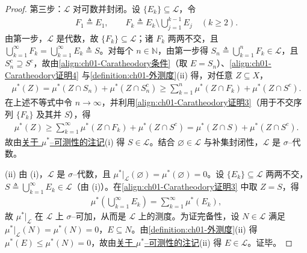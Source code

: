 \documentclass[../../main.tex]{subfiles}%
\begin{document}
\begin{proof}
第三步：$\mathcal{L}$ 对可数并封闭。设 $\{E_k\}\subseteq\mathcal{L}$，令
\begin{align*}
F_1\triangleq E_1,\qquad F_k\triangleq E_k\setminus\bigcup_{j=1}^{k-1}E_j\quad(k\geqslant 2).
\end{align*}
由第一步，$\mathcal{L}$ 是代数，故 $\{F_k\}\subseteq\mathcal{L}$；诸 $F_k$ 两两不交，且 $\bigcup_{k=1}^\infty F_k=\bigcup_{k=1}^\infty E_k\triangleq S$。对每个 $n\in\mathbb{N}$，由第一步得 $S_n\triangleq\bigcup_{k=1}^n F_k\in\mathcal{L}$，且 $S_n^c\supseteq S^c$，故由\eqref{align:ch01-Caratheodory条件}（取 $E=S_n$）、\eqref{align:ch01-Caratheodory证明4} 与\cref{definition:ch01-外测度}(ii) 得，对任意 $Z\subseteq X$，
\begin{align*}
\mu^*(Z)=\mu^*(Z\cap S_n)+\mu^*(Z\cap S_n^c)\geqslant\sum_{k=1}^n\mu^*(Z\cap F_k)+\mu^*(Z\cap S^c).
\end{align*}
在上述不等式中令 $n\to\infty$，并利用\eqref{align:ch01-Caratheodory证明3}（用于不交序列 $\{F_k\}$ 及其并 $S$），得
\begin{align*}
\mu^*(Z)\geqslant\sum_{k=1}^\infty\mu^*(Z\cap F_k)+\mu^*(Z\cap S^c)=\mu^*(Z\cap S)+\mu^*(Z\cap S^c).
\end{align*}
故由\hyperref[remark:ch01-外测度可测]{关于 $\mu^*$--可测性的注记}(i) 得 $S\in\mathcal{L}$。结合 $\varnothing\in\mathcal{L}$ 与补集封闭性，$\mathcal{L}$ 是 $\sigma$--代数。

(ii) 由 (i)，$\mathcal{L}$ 是 $\sigma$--代数，且 $\mu^*|_{\mathcal{L}}(\varnothing )=\mu^*(\varnothing )=0$。设 $\{E_k\}\subseteq\mathcal{L}$ 两两不交，$S\triangleq\bigcup_{k=1}^\infty E_k\in\mathcal{L}$（由 (i)）。在\eqref{align:ch01-Caratheodory证明3} 中取 $Z=S$，得
\begin{align*}
\mu^*\left(\bigcup_{k=1}^\infty E_k\right)=\sum_{k=1}^\infty\mu^*(E_k),
\end{align*}
故 $\mu^*|_{\mathcal{L}}$ 在 $\mathcal{L}$ 上 $\sigma$--可加，从而是 $\mathcal{L}$ 上的测度。为证完备性，设 $N\in\mathcal{L}$ 满足 $\mu^*|_{\mathcal{L}}(N)=\mu^*(N)=0$，$E\subseteq N$。由\cref{definition:ch01-外测度}(ii) 得 $\mu^*(E)\leqslant\mu^*(N)=0$，故由\hyperref[remark:ch01-外测度可测]{关于 $\mu^*$--可测性的注记}(ii) 得 $E\in\mathcal{L}$。证毕。
\end{proof}
\end{document}
